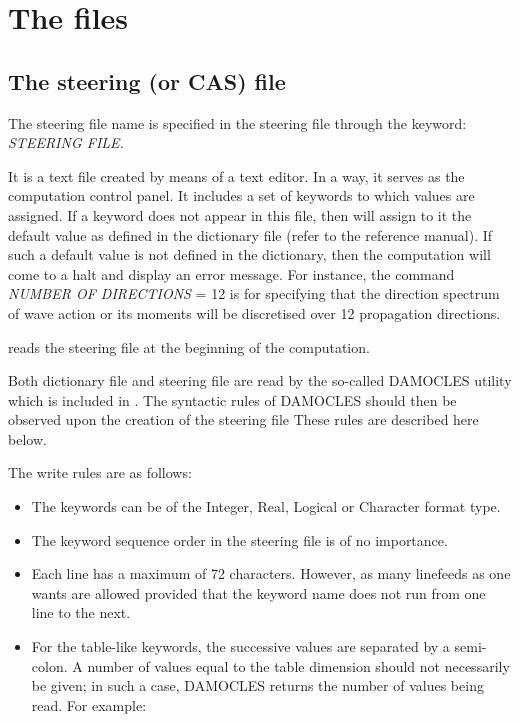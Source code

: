 \section{ The files}

\subsection{ The steering (or CAS) file}
\label{se:steeringfile}
 The steering file name is specified in the steering file through the keyword: \textit{STEERING FILE.}

 It is a text file created by means of a text editor. In a way, it serves as the computation control panel. It includes a set of keywords to which values are assigned. If a keyword does not appear in this file, then \tomawac will assign to it the default value as defined in the dictionary file (refer to the reference manual). If such a default value is not defined in the dictionary, then the computation will come to a halt and display an error message. For instance, the command \textit{NUMBER OF DIRECTIONS} = 12 is for specifying that the direction spectrum of wave action or its moments will be discretised over 12 propagation directions.

 \tomawac reads the steering file at the beginning of the computation.

 Both dictionary file and steering file are read by the so-called DAMOCLES utility which is included in \tomawac. The syntactic rules of DAMOCLES should then be observed upon the creation of the steering file These rules are described here below.

 The write rules are as follows:

\begin{itemize}
\item  The keywords can be of the Integer, Real, Logical or Character format type.

\item  The keyword sequence order in the steering file is of no importance.

\item  Each line has a maximum of 72 characters. However, as many linefeeds as one wants are allowed provided that the keyword name does not run from one line to the next.

\item  For the table-like keywords, the successive values are separated by a semi-colon. A number of values equal to the table dimension should not necessarily be given; in such a case, DAMOCLES returns the number of values being read. For example:
\end{itemize}

